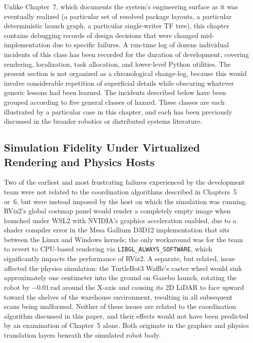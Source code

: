Unlike Chapter~7, which documents the system's engineering surface as it was eventually realized (a particular set of resolved package layouts, a particular deterministic launch graph, a particular single-writer TF tree), this chapter contains debugging records of design decisions that were changed mid-implementation due to specific failures. A run-time log of dozens individual incidents of this class has been recorded for the duration of development, covering rendering, localization, task allocation, and lower-level Python utilities. The present section is not organized as a chronological change-log, because this would involve considerable repetition of superficial details while obscuring whatever generic lessons had been learned. The incidents described below have been grouped according to five general classes of hazard. These classes are each illustrated by a particular case in this chapter, and each has been previously discussed in the broader robotics or distributed systems literature.

\subsection{Simulation Fidelity Under Virtualized Rendering and Physics Hosts}

Two of the earliest and most frustrating failures experienced by the development team were not related to the coordination algorithms described in Chapters~5 or~6, but were instead imposed by the host on which the simulation was running. RViz2's global costmap panel would render a completely empty image when launched under WSL2 with NVIDIA's graphics acceleration enabled, due to a shader compiler error in the Mesa Gallium D3D12 implementation that sits between the Linux and Windows kernels; the only workaround was for the team to revert to CPU-based rendering via \texttt{LIBGL\_ALWAYS\_SOFTWARE}, which significantly impacts the performance of RViz2. A separate, but related, issue affected the physics simulation: the TurtleBot3 Waffle's caster wheel would sink approximately one centimeter into the ground on Gazebo launch, rotating the robot by $-0.01\,\text{rad}$ around the X-axis and causing its 2D LiDAR to face upward toward the shelves of the warehouse environment, resulting in all subsequent scans being malformed. Neither of these issues are related to the coordination algorithm discussed in this paper, and their effects would not have been predicted by an examination of Chapter~5 alone. Both originate in the graphics and physics translation layers beneath the simulated robot body.

